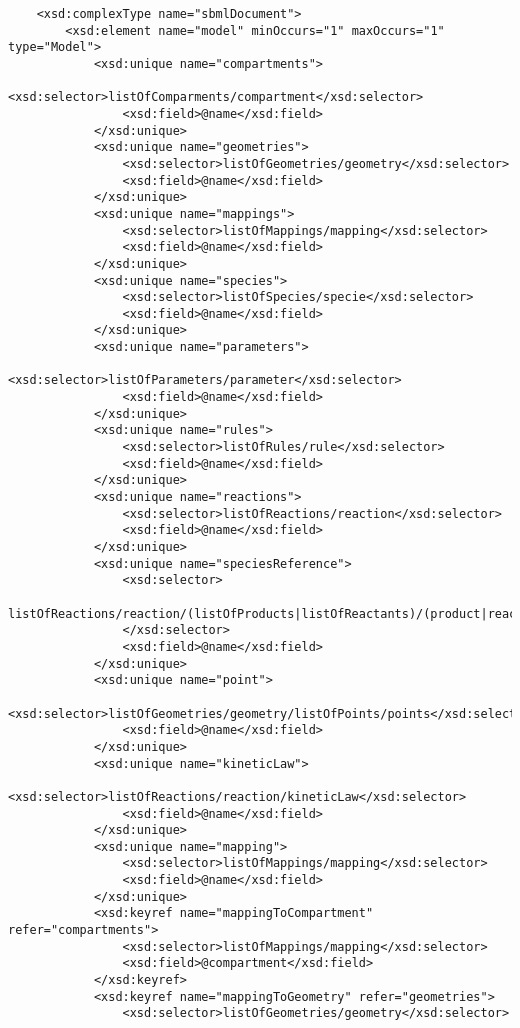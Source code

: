 \documentclass[10pt]{article}
\begin{document}
\begin{small}
\begin{verbatim}
    <xsd:complexType name="sbmlDocument">
        <xsd:element name="model" minOccurs="1" maxOccurs="1" type="Model">
            <xsd:unique name="compartments">
                <xsd:selector>listOfComparments/compartment</xsd:selector>
                <xsd:field>@name</xsd:field>
            </xsd:unique>
            <xsd:unique name="geometries">
                <xsd:selector>listOfGeometries/geometry</xsd:selector>
                <xsd:field>@name</xsd:field>
            </xsd:unique>
            <xsd:unique name="mappings">
                <xsd:selector>listOfMappings/mapping</xsd:selector>
                <xsd:field>@name</xsd:field>
            </xsd:unique>
            <xsd:unique name="species">
                <xsd:selector>listOfSpecies/specie</xsd:selector>
                <xsd:field>@name</xsd:field>
            </xsd:unique>
            <xsd:unique name="parameters">
                <xsd:selector>listOfParameters/parameter</xsd:selector>
                <xsd:field>@name</xsd:field>
            </xsd:unique>
            <xsd:unique name="rules">
                <xsd:selector>listOfRules/rule</xsd:selector>
                <xsd:field>@name</xsd:field>
            </xsd:unique>
            <xsd:unique name="reactions">
                <xsd:selector>listOfReactions/reaction</xsd:selector>
                <xsd:field>@name</xsd:field>
            </xsd:unique>
            <xsd:unique name="speciesReference">
                <xsd:selector>
                    listOfReactions/reaction/(listOfProducts|listOfReactants)/(product|reactant)
                </xsd:selector>
                <xsd:field>@name</xsd:field>
            </xsd:unique>
            <xsd:unique name="point">
                <xsd:selector>listOfGeometries/geometry/listOfPoints/points</xsd:selector>
                <xsd:field>@name</xsd:field>
            </xsd:unique>
            <xsd:unique name="kineticLaw">
                <xsd:selector>listOfReactions/reaction/kineticLaw</xsd:selector>
                <xsd:field>@name</xsd:field>
            </xsd:unique>
            <xsd:unique name="mapping">
                <xsd:selector>listOfMappings/mapping</xsd:selector>
                <xsd:field>@name</xsd:field>
            </xsd:unique>
            <xsd:keyref name="mappingToCompartment" refer="compartments">
                <xsd:selector>listOfMappings/mapping</xsd:selector>
                <xsd:field>@compartment</xsd:field>
            </xsd:keyref>
            <xsd:keyref name="mappingToGeometry" refer="geometries">
                <xsd:selector>listOfGeometries/geometry</xsd:selector>

\end{verbatim}
\end{small}
\end{document}
